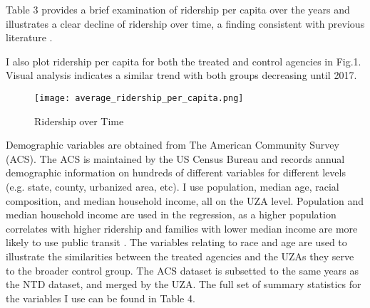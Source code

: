 \documentclass [12pt]{report}
\begin{document}
Table 3 provides a brief examination of ridership per capita over the years and illustrates a clear decline of ridership over time, a finding consistent with previous literature \parencite{erhardt22}.
\begin{table}[H] 
\tiny
\centering \renewcommand*{\arraystretch}{1.1}\caption{Ridership per capita by year}
\end{table}
I also plot ridership per capita for both the treated and control agencies in Fig.1. Visual analysis indicates a similar trend with both groups decreasing until 2017. 
\begin{figure}[H]
    \centering
    \texttt{[image: average\_ridership\_per\_capita.png]} %
    \caption{Ridership over Time}
\end{figure}
\indent Demographic variables are obtained from The American Community Survey (ACS). The ACS is maintained by the US Census Bureau and records annual demographic information on hundreds of different variables for different levels (e.g. state, county, urbanized area, etc). I use population, median age, racial composition, and median household income, all on the UZA level. Population and median household income are used in the regression, as a higher population correlates with higher ridership and families with lower median income are more likely to use public transit \parencite{wang}. The variables relating to race and age are used to illustrate the similarities between the treated agencies and the UZAs they serve to the broader control group. The ACS dataset is subsetted to the same years as the NTD dataset, and merged by the UZA. The full set of summary statistics for the variables I use can be found in Table 4.\\
\end{document}
